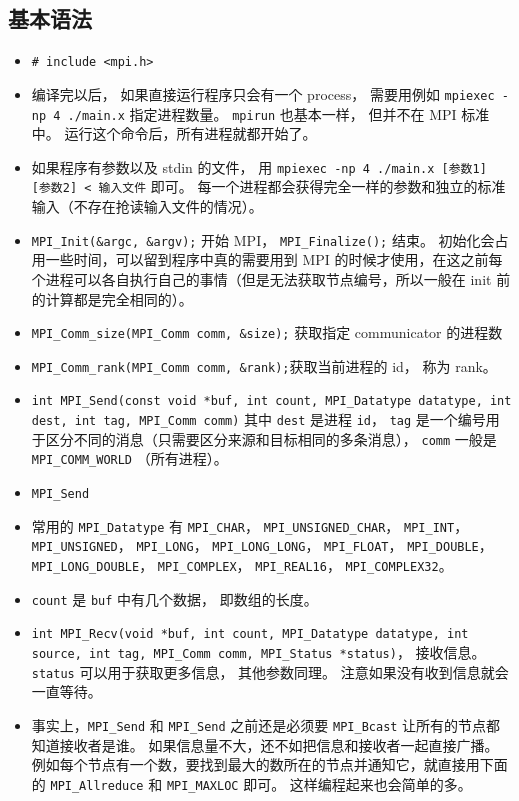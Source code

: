 \subsection{基本语法}
\begin{itemize}
\item \verb|# include <mpi.h>|
\item 编译完以后， 如果直接运行程序只会有一个 process， 需要用例如 \verb|mpiexec -np 4 ./main.x| 指定进程数量。 \verb|mpirun| 也基本一样， 但并不在 MPI 标准中。 运行这个命令后，所有进程就都开始了。
\item 如果程序有参数以及 stdin 的文件， 用 \verb`mpiexec -np 4 ./main.x [参数1] [参数2] < 输入文件` 即可。 每一个进程都会获得完全一样的参数和独立的标准输入（不存在抢读输入文件的情况）。
\item \verb|MPI_Init(&argc, &argv);| 开始 MPI， \verb|MPI_Finalize();| 结束。 初始化会占用一些时间，可以留到程序中真的需要用到 MPI 的时候才使用，在这之前每个进程可以各自执行自己的事情（但是无法获取节点编号，所以一般在 init 前的计算都是完全相同的）。
\item \verb|MPI_Comm_size(MPI_Comm comm, &size);| 获取指定 communicator 的进程数
\item \verb|MPI_Comm_rank(MPI_Comm comm, &rank);|获取当前进程的 id， 称为 rank。
\item \verb|int MPI_Send(const void *buf, int count, MPI_Datatype datatype, int dest, int tag, MPI_Comm comm)| 其中 \verb|dest| 是进程 \verb|id|， \verb|tag| 是一个编号用于区分不同的消息（只需要区分来源和目标相同的多条消息）， \verb|comm| 一般是 \verb|MPI_COMM_WORLD| （所有进程）。
\item \verb`MPI_Send`
\item 常用的 \verb|MPI_Datatype| 有 \verb|MPI_CHAR|， \verb|MPI_UNSIGNED_CHAR|， \verb|MPI_INT|， \verb|MPI_UNSIGNED|， \verb|MPI_LONG|， \verb|MPI_LONG_LONG|， \verb|MPI_FLOAT|， \verb|MPI_DOUBLE|， \verb|MPI_LONG_DOUBLE|， \verb|MPI_COMPLEX|， \verb|MPI_REAL16|， \verb|MPI_COMPLEX32|。
\item \verb|count| 是 \verb|buf| 中有几个数据， 即数组的长度。
\item \verb|int MPI_Recv(void *buf, int count, MPI_Datatype datatype, int source, int tag, MPI_Comm comm, MPI_Status *status)|， 接收信息。 \verb|status| 可以用于获取更多信息， 其他参数同理。 注意如果没有收到信息就会一直等待。
\item 事实上，\verb`MPI_Send` 和 \verb`MPI_Send` 之前还是必须要 \verb`MPI_Bcast` 让所有的节点都知道接收者是谁。 如果信息量不大，还不如把信息和接收者一起直接广播。例如每个节点有一个数，要找到最大的数所在的节点并通知它，就直接用下面的 \verb`MPI_Allreduce` 和 \verb`MPI_MAXLOC` 即可。 这样编程起来也会简单的多。

\end{itemize}
